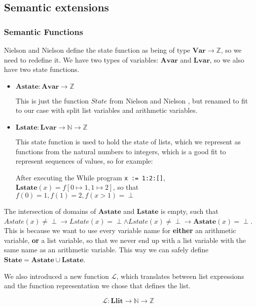 \documentclass[12pt]{article}
\newcommand\mono\texttt
\newcommand{\LL}{\mathcal{L}}
\newcommand{\Var}{\mathbf{Var}}
\newcommand{\Avar}{\mathbf{Avar}}
\newcommand{\Lvar}{\mathbf{Lvar}}
\newcommand{\Astate}{\mathbf{Astate}}
\newcommand{\Lstate}{\mathbf{Lstate}}
\newcommand{\Llit}{\mathbf{Llit}}
\begin{document}
\subsection{Semantic extensions} %

\subsubsection{Semantic Functions}

Nielson and Nielson define the state function as being of type $\Var \rightarrow \mathbb{Z}$, so we need to redefine it. We have two types of variables: $\Avar$ and $\Lvar$, so we also have two state functions.

\begin{itemize}
    \item $\Astate: \Avar \rightarrow \mathbb{Z}$

    This is just the function $State$ from Nielson and Nielson \cite{wiley}, but renamed to fit to our case with split list variables and arithmetic variables.
    \item $\Lstate: \Lvar \rightarrow \mathbb{N} \rightarrow \mathbb{Z}$

    This state function is used to hold the state of lists, which we represent as functions from the natural numbers to integers, which is a good fit to represent sequences of values, so for example:

    After executing the While program \mono{x := 1:2:[]}, $\Lstate(x) = f[0 \mapsto 1, 1 \mapsto 2]$, so that $f(0) = 1, f(1) = 2, f(x > 1) = \perp$
\end{itemize}

The intersection of domains of $\Astate$ and $\Lstate$ is empty, such that $Astate(x) \neq \perp \rightarrow Lstate(x) = \perp \land Lstate(x) \neq \perp \rightarrow \Astate(x) = \perp$. This is because we want to use every variable name for \textbf{either} an arithmetic variable, \textbf{or} a list variable, so that we never end up with a list variable with the same name as an arithmetic variable. This way we can safely define $\mathbf{State} = \Astate \cup \Lstate$.

We also introduced a new function $\LL$, which translates between list expressions and the function representation we chose that defines the list.

$$\LL: \Llit \rightarrow \mathbb{N} \rightarrow \mathbb{Z}$$
\end{document}
